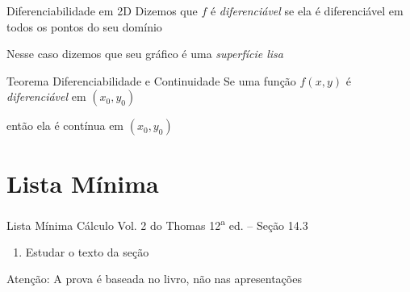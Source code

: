 \documentclass[fleqn,utf8,aspectratio=169,12pt,ignorenonframetext]{beamer}
\begin{document}
\begin{frame}{Diferenciabilidade em 2D}
  Dizemos que $f$ é \emph{diferenciável}
  se ela é diferenciável em todos os
  pontos do seu domínio

  \pause
  \vspace{0.5\baselineskip}
  Nesse caso dizemos que seu gráfico é uma \emph{superfície lisa}
\end{frame}

\begin{frame}{Teorema Diferenciabilidade e Continuidade}
    Se uma função $f(x, y)$ é \emph{diferenciável} em \((x_0, y_0)\)

    \pause
    \vspace{0.5\baselineskip}
    então ela é contínua em \((x_0, y_0)\)
\end{frame}

\section{Lista Mínima}

\begin{frame}{Lista Mínima}
  Cálculo Vol. 2 do Thomas 12\textsuperscript{a} ed. -- Seção 14.3
  \begin{enumerate}
    \item Estudar o texto da seção
  \end{enumerate}

  \vfill
  Atenção: A prova é baseada no livro, não nas apresentações
\end{frame}

\end{document}
